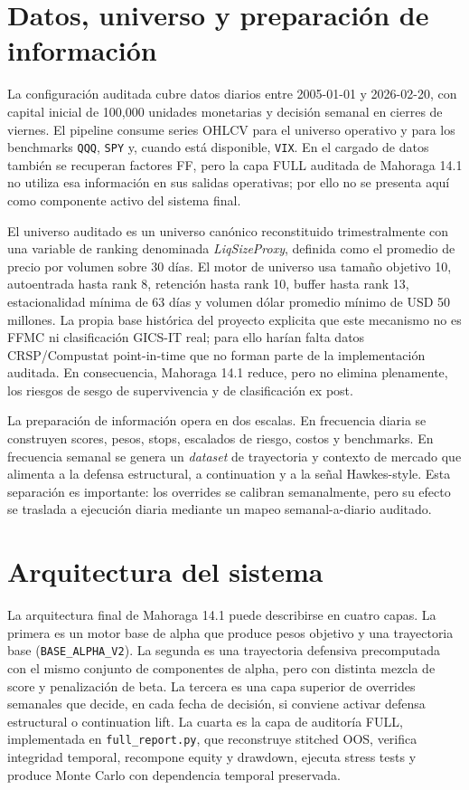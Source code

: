 \documentclass[11pt]{article}
\begin{document}
\section{Datos, universo y preparaci\'on de informaci\'on}
La configuraci\'on auditada cubre datos diarios entre 2005-01-01 y 2026-02-20, con capital inicial de 100{,}000 unidades monetarias y decisi\'on semanal en cierres de viernes. El pipeline consume series OHLCV para el universo operativo y para los benchmarks \texttt{QQQ}, \texttt{SPY} y, cuando est\'a disponible, \texttt{VIX}. En el cargado de datos tambi\'en se recuperan factores FF, pero la capa FULL auditada de Mahoraga 14.1 no utiliza esa informaci\'on en sus salidas operativas; por ello no se presenta aqu\'i como componente activo del sistema final.

El universo auditado es un universo can\'onico reconstituido trimestralmente con una variable de ranking denominada \textit{LiqSizeProxy}, definida como el promedio de precio por volumen sobre 30 d\'ias. El motor de universo usa tama\~no objetivo 10, autoentrada hasta rank 8, retenci\'on hasta rank 10, buffer hasta rank 13, estacionalidad m\'inima de 63 d\'ias y volumen d\'olar promedio m\'inimo de USD 50 millones. La propia base hist\'orica del proyecto explicita que este mecanismo no es FFMC ni clasificaci\'on GICS-IT real; para ello har\'ian falta datos CRSP/Compustat point-in-time que no forman parte de la implementaci\'on auditada. En consecuencia, Mahoraga 14.1 reduce, pero no elimina plenamente, los riesgos de sesgo de supervivencia y de clasificaci\'on ex post.

La preparaci\'on de informaci\'on opera en dos escalas. En frecuencia diaria se construyen scores, pesos, stops, escalados de riesgo, costos y benchmarks. En frecuencia semanal se genera un \textit{dataset} de trayectoria y contexto de mercado que alimenta a la defensa estructural, a continuation y a la se\~nal Hawkes-style. Esta separaci\'on es importante: los overrides se calibran semanalmente, pero su efecto se traslada a ejecuci\'on diaria mediante un mapeo semanal-a-diario auditado.

\section{Arquitectura del sistema}
La arquitectura final de Mahoraga 14.1 puede describirse en cuatro capas. La primera es un motor base de alpha que produce pesos objetivo y una trayectoria base (\texttt{BASE\_ALPHA\_V2}). La segunda es una trayectoria defensiva precomputada con el mismo conjunto de componentes de alpha, pero con distinta mezcla de score y penalizaci\'on de beta. La tercera es una capa superior de overrides semanales que decide, en cada fecha de decisi\'on, si conviene activar defensa estructural o continuation lift. La cuarta es la capa de auditor\'ia FULL, implementada en \texttt{full\_report.py}, que reconstruye stitched OOS, verifica integridad temporal, recompone equity y drawdown, ejecuta stress tests y produce Monte Carlo con dependencia temporal preservada.
\end{document}
